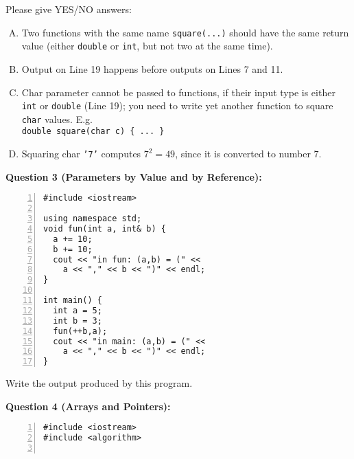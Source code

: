 \documentclass[11pt]{article}
\begin{document}
{Please give YES/NO answers:

\begin{enumerate}[(A)]
\item Two functions with the same name {\tt square(...)} should have 
the same return value (either {\tt double} or {\tt int}, but not two at the same time).
\item Output on Line 19 happens before outputs on Lines 7 and 11.  
\item Char parameter cannot be passed to functions, if their input type 
is either {\tt int} or {\tt double} (Line 19); you need to write yet another
function to square {\tt char} values. E.g.\\
{\tt double square(char c) \{ ... \}}
\item Squaring char {\tt '7'} computes $7^2 = 49$, since it is converted to number $7$. 
\end{enumerate}






\newpage
{\bf Question 3 (Parameters by Value and by Reference):} 

{\footnotesize
\begin{center}
\begin{minipage}{.8\columnwidth}
\begin{Verbatim}[frame=single,numbers=left]
#include <iostream>

using namespace std;
void fun(int a, int& b) {
  a += 10; 
  b += 10;
  cout << "in fun: (a,b) = (" << 
    a << "," << b << ")" << endl;  
}

int main() {
  int a = 5;
  int b = 3; 
  fun(++b,a);
  cout << "in main: (a,b) = (" <<
    a << "," << b << ")" << endl;
}
\end{Verbatim}
\end{minipage}
\end{center}
}

Write the output produced by this program. 






\vspace{20pt}
{\bf Question 4 (Arrays and Pointers):} 

{\footnotesize
\begin{center}
\begin{minipage}{.8\columnwidth}
\begin{Verbatim}[frame=single,numbers=left]
#include <iostream>
#include <algorithm>


\end{Verbatim}
\end{minipage}
\end{center}}}
\end{document}
